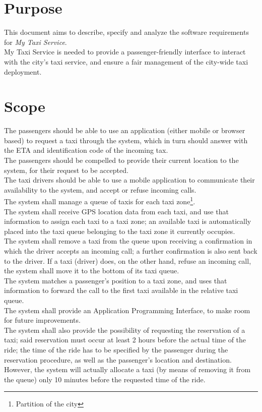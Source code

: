 \section{Purpose}
This document aims to describe, specify and analyze the software requirements for \textit{My Taxi Service}. \\
My Taxi Service is needed to provide a passenger-friendly interface to interact with the city's taxi service, and ensure
a fair management of the city-wide taxi deployment.


\section{Scope}
The passengers should be able to use an application (either mobile or browser based) to request a taxi through the system,
which in turn should answer with the ETA and identification code of the incoming tax. \\
The passengers should be compelled to provide their current location to the system, for their request to be accepted. \\
The taxi drivers should be able to use a mobile application to communicate their availability to the system, and accept
 or refuse incoming calls. \\
The system shall manage a queue of taxis for each taxi zone\footnote{Partition of the city}. \\
The system shall receive GPS location data from each taxi, and use that information to assign each taxi to a 
taxi zone; an available taxi is automatically placed into the taxi queue belonging to the taxi zone it currently occupies. \\
The system shall remove a taxi from the queue upon receiving a confirmation in which the driver accepts an incoming call; a
further confirmation is also sent back to the driver.
 If a taxi (driver) does, on the other hand, refuse an incoming call, the system
shall move it to the bottom of its taxi queue. \\
The system matches a passenger's position to a taxi zone, and uses that information to forward the call to the first taxi
available in the relative taxi queue. \\
The system shall provide an Application Programming Interface, to make room for future improvements. \\
The system shall also provide the possibility of requesting the reservation of a taxi; said reservation must occur at least
2 hours before the actual time of the ride; the time of the ride has to be specified by the passenger during the
reservation procedure, as well as the passenger's location and destination. \\
However, the system will actually allocate a taxi (by means of removing it from the queue) only 10 minutes before the
requested time of the ride.


